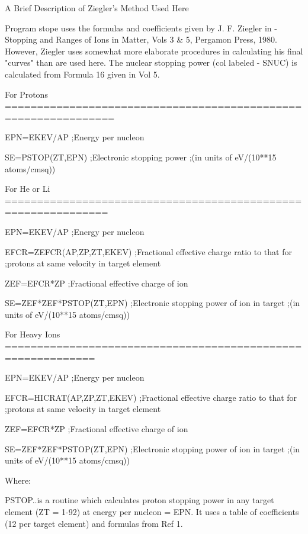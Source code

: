                 A Brief Description of Ziegler's Method Used Here
 
   Program  stope uses the formulas and coefficients given by J. F. Ziegler in
   - Stopping and Ranges of Ions in Matter, Vols 3 & 5, Pergamon Press,  1980.
   However,  Ziegler  uses  somewhat  more elaborate procedures in calculating
   his final "curves" than are used here.  The  nuclear  stopping  power  (col
   labeled - SNUC) is calculated from Formula 16 given in Vol 5.
 
   For Protons ===============================================================
 
   EPN=EKEV/AP                ;Energy per nucleon
 
   SE=PSTOP(ZT,EPN)           ;Electronic stopping power
                              ;(in units of eV/(10**15 atoms/cmsq))
 
   For He or Li ==============================================================
 
   EPN=EKEV/AP                ;Energy per nucleon
 
   EFCR=ZEFCR(AP,ZP,ZT,EKEV)  ;Fractional effective charge ratio to that for
                              ;protons at same velocity in target element
 
   ZEF=EFCR*ZP                ;Fractional effective charge of ion
 
   SE=ZEF*ZEF*PSTOP(ZT,EPN)   ;Electronic stopping power of ion in target
                              ;(in units of eV/(10**15 atoms/cmsq))
 
   For Heavy Ions ============================================================
 
   EPN=EKEV/AP                ;Energy per nucleon
 
   EFCR=HICRAT(AP,ZP,ZT,EKEV) ;Fractional effective charge ratio to that for
                              ;protons at same velocity in target element
 
   ZEF=EFCR*ZP                ;Fractional effective charge of ion
 
   SE=ZEF*ZEF*PSTOP(ZT,EPN)   ;Electronic stopping power of ion in target
                              ;(in units of eV/(10**15 atoms/cmsq))
 
   Where:
 
   PSTOP..is  a  routine  which calculates proton stopping power in any target
          element (ZT = 1-92) at energy per nucleon = EPN. It uses a table  of
          coefficients (12 per target element) and formulas from Ref 1.
 
